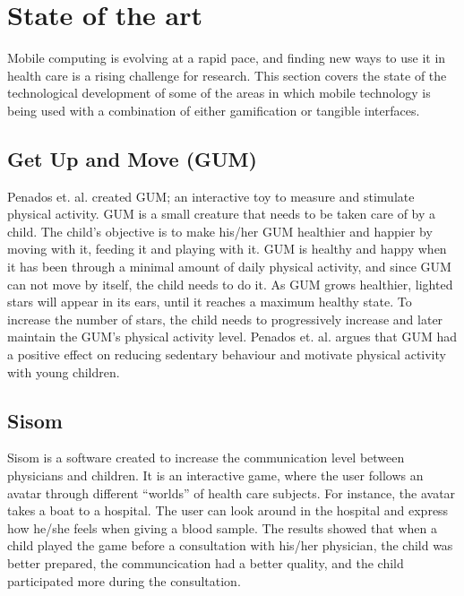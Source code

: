\section{State of the art}
\label{sec:stateoftheart}
Mobile computing is evolving at a rapid pace, and finding new ways to use it in health care is a rising challenge for research. This section covers the state of the technological development of some of the areas in which mobile technology is being used with a combination of either gamification or tangible interfaces.   


\subsection{Get Up and Move (GUM)}
\label{sec:gum}
Penados et. al.\cite{penadosget} created GUM; an interactive toy to measure and stimulate physical activity. GUM is a small creature that needs to be taken care of by a child. The child's objective is to make his/her GUM healthier and happier by moving with it, feeding it and playing with it. GUM is healthy and happy when it has been through a minimal amount of daily physical activity, and since GUM can not move by itself, the child needs to do it. As GUM grows healthier, lighted stars will appear in its ears, until it reaches a maximum healthy state. To increase the number of stars, the child needs to progressively increase and later maintain the GUM's physical activity level. Penados et. al. argues that GUM had a positive effect on reducing sedentary behaviour and motivate physical activity with young children.


\subsection{Sisom}
\label{sec:sisom}
Sisom is a software created to increase the communication level between physicians and children. It is an interactive game, where the user follows an avatar through different ``worlds'' of health care subjects. For instance, the avatar takes a boat to a hospital. The user can look around in the hospital and express how he/she feels when giving a blood sample. The results showed that when a child played the game before a consultation with his/her physician, the child was better prepared, the communcication had a better quality, and the child participated more during the consultation\cite{sisom-research}.


